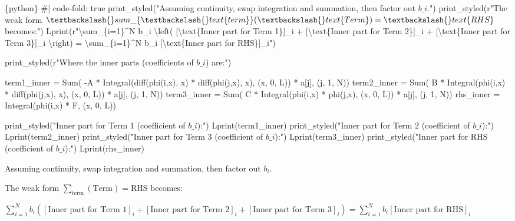 \documentclass[
  11pt,
  a4paper,
]{scrbook}
\newenvironment{Shaded}{\begin{snugshade}}{\end{snugshade}}
\newcommand{\InformationTok}[1]{\textcolor[rgb]{0.37,0.37,0.37}{#1}}
\begin{document}
\begin{Shaded}
\begin{Highlighting}[]
\InformationTok{\textasciigrave{}\textasciigrave{}\textasciigrave{}\{python\}}
\InformationTok{\#| code{-}fold: true}
\InformationTok{print\_styled("Assuming continuity, swap integration and summation, then factor out $b\_i$.")}
\InformationTok{print\_styled(r"The weak form $\textbackslash{}sum\_\{\textbackslash{}text\{term\}\} (\textbackslash{}text\{Term\}) = \textbackslash{}text\{RHS\}$ becomes:")}
\InformationTok{Lprint(r"\textbackslash{}sum\_\{i=1\}\^{}N b\_i \textbackslash{}left( [\textbackslash{}text\{Inner part for Term 1\}]\_i + [\textbackslash{}text\{Inner part for Term 2\}]\_i + [\textbackslash{}text\{Inner part for Term 3\}]\_i \textbackslash{}right) = \textbackslash{}sum\_\{i=1\}\^{}N b\_i [\textbackslash{}text\{Inner part for RHS\}]\_i")}

\InformationTok{print\_styled(r"Where the inner parts (coefficients of $b\_i$) are:")}

\InformationTok{term1\_inner = Sum( {-}A * Integral(diff(phi(i,x), x) * diff(phi(j,x), x), (x, 0, L)) * a[j], (j, 1, N))}
\InformationTok{term2\_inner = Sum(  B * Integral(phi(i,x) * diff(phi(j,x), x), (x, 0, L)) * a[j], (j, 1, N))}
\InformationTok{term3\_inner = Sum(  C * Integral(phi(i,x) * phi(j,x), (x, 0, L)) * a[j], (j, 1, N))}
\InformationTok{rhs\_inner = Integral(phi(i,x) * F, (x, 0, L))}

\InformationTok{print\_styled("Inner part for Term 1 (coefficient of $b\_i$):")}
\InformationTok{Lprint(term1\_inner)}
\InformationTok{print\_styled("Inner part for Term 2 (coefficient of $b\_i$):")}
\InformationTok{Lprint(term2\_inner)}
\InformationTok{print\_styled("Inner part for Term 3 (coefficient of $b\_i$):")}
\InformationTok{Lprint(term3\_inner)}
\InformationTok{print\_styled("Inner part for RHS (coefficient of $b\_i$):")}
\InformationTok{Lprint(rhs\_inner)}
\InformationTok{\textasciigrave{}\textasciigrave{}\textasciigrave{}}
\end{Highlighting}
\end{Shaded}

Assuming continuity, swap integration and summation, then factor out
\(b_i\).

The weak form \(\sum_{\text{term}} (\text{Term}) = \text{RHS}\) becomes:

$\displaystyle \sum_{i=1}^N b_i \left( [\text{Inner part for Term 1}]_i + [\text{Inner part for Term 2}]_i + [\text{Inner part for Term 3}]_i \right) = \sum_{i=1}^N b_i [\text{Inner part for RHS}]_i$
\end{document}
